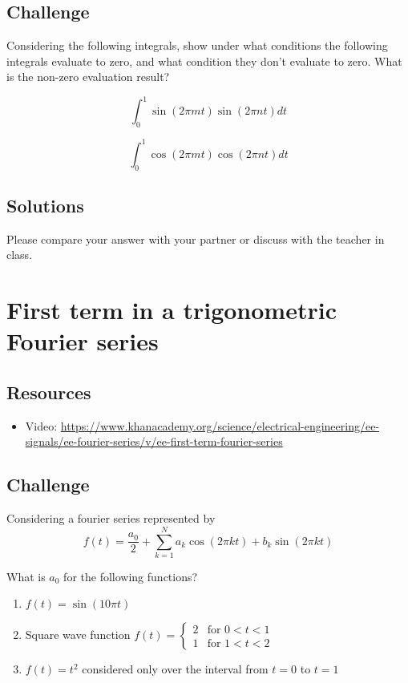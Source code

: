 \subsection*{Challenge}
Considering the following integrals, show under what conditions the following integrals evaluate to zero, and what condition they don't evaluate to zero. What is the non-zero evaluation result?

\begin{equation}
    \int_0^1 \sin(2 \pi m t) \sin(2 \pi n t) dt
\end{equation}

\begin{equation}
    \int_0^1 \cos(2 \pi m t) \cos(2 \pi n t) dt
\end{equation}

\subsection*{Solutions}
Please compare your answer with your partner or discuss with the teacher in class.





\newpage
\section{First term in a trigonometric Fourier series}

\subsection*{Resources}
\begin{itemize}
    \item Video: \url{https://www.khanacademy.org/science/electrical-engineering/ee-signals/ee-fourier-series/v/ee-first-term-fourier-series}
\end{itemize}

\subsection*{Challenge}
Considering a fourier series represented by
\begin{equation}
    f(t) = \frac{a_0}{2} + \sum_{k=1}^{N} a_k \cos(2 \pi k t) + b_k \sin(2 \pi k t)
\end{equation}

What is $a_0$ for the following functions?
\begin{enumerate}
    \item $f(t) = \sin(10 \pi t)$
    \item Square wave function $f(t) = \begin{cases} 2 & \text{for } 0<t<1 \\ 1 & \text{for } 1<t<2 \end{cases}$
    \item $f(t) = t^2$ considered only over the interval from $t=0$ to $t=1$
\end{enumerate}

